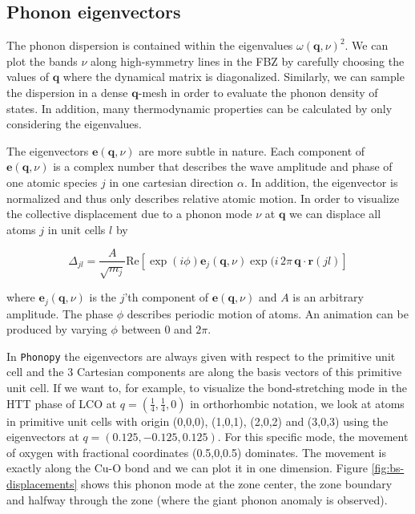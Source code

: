 \subsection{Phonon eigenvectors}
The phonon dispersion is contained within the eigenvalues $\omega (\bm{q},\nu)^2$. We can plot the bands $\nu$ along high-symmetry lines in the FBZ by carefully choosing the values of $\bm{q}$ where the dynamical matrix is diagonalized. Similarly, we can sample the dispersion in a dense $\bm{q}$-mesh in order to evaluate the phonon density of states. In addition, many thermodynamic properties can be calculated by only considering the eigenvalues.

The eigenvectors $\bm{e}(\bm{q}, \nu)$ are more subtle in nature. Each component of  $\bm{e}(\bm{q}, \nu)$ is a complex number that describes the wave amplitude and phase of one atomic species $j$ in one cartesian direction $\alpha$. In addition, the eigenvector is normalized and thus only describes relative atomic motion. In order to visualize the collective displacement due to a phonon mode $\nu$ at $\bm{q}$ we can displace all atoms $j$ in unit cells $l$ by

\begin{equation}
\Delta_{jl} = \frac{A}{\sqrt{m_j}} \text{Re} \left[ \exp (i\phi) \bm{e}_j(\bm{q}, \nu) \exp (i \, 2 \pi \, \bm{q} \cdot \bm{r}(jl) \right] \label{eq:displacements}
\end{equation}

\noindent where $\bm{e}_j(\bm{q}, \nu)$ is the $j$'th component of $\bm{e}(\bm{q}, \nu)$ and $A$ is an arbitrary amplitude. The phase $\phi$ describes periodic motion of atoms. An animation can be produced by varying $\phi$ between 0 and $2 \pi$.

In \texttt{Phonopy} the eigenvectors are always given with respect to the primitive unit cell and the 3 Cartesian components are along the basis vectors of this primitive unit cell. If we want to, for example, to visualize the bond-stretching mode in the HTT phase of LCO at $q=(\frac{1}{4},\frac{1}{4},0)$ in orthorhombic notation, we look at atoms in primitive unit cells with origin (0,0,0), (1,0,1), (2,0,2) and (3,0,3) using the eigenvectors at $q=(0.125,-0.125,0.125)$. For this specific mode, the movement of oxygen with fractional coordinates (0.5,0,0.5) dominates. The movement is exactly along the Cu-O bond and we can plot it in one dimension. Figure \ref{fig:bs-displacements} shows this phonon mode at the zone center, the zone boundary and halfway through the zone (where the giant phonon anomaly is observed).

